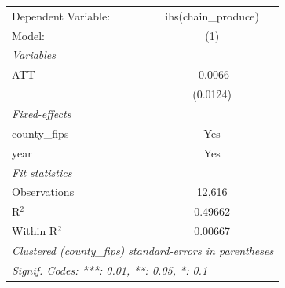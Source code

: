 
\begingroup
\centering
\begin{tabular}{lc}
   \tabularnewline \midrule \midrule
   Dependent Variable: & ihs(chain\_produce)\\   
   Model:              & (1)\\  
   \midrule
   \emph{Variables}\\
   ATT                 & -0.0066\\   
                       & (0.0124)\\   
   \midrule
   \emph{Fixed-effects}\\
   county\_fips        & Yes\\  
   year                & Yes\\  
   \midrule
   \emph{Fit statistics}\\
   Observations        & 12,616\\  
   R$^2$               & 0.49662\\  
   Within R$^2$        & 0.00667\\  
   \midrule \midrule
   \multicolumn{2}{l}{\emph{Clustered (county\_fips) standard-errors in parentheses}}\\
   \multicolumn{2}{l}{\emph{Signif. Codes: ***: 0.01, **: 0.05, *: 0.1}}\\
\end{tabular}
\par\endgroup


